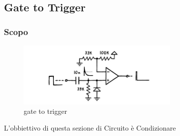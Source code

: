 \documentclass{article}
\theoremstyle{definition}
\begin{document}
\subsection{Gate to Trigger}
\subsubsection{Scopo}

\begin{figure}[htp]
    \centering
    \includegraphics[width=0.7\textwidth]{gatebase.png} 
    \caption{gate to trigger}
    \label{fig:gate to trigger}
\end{figure}
L'obbiettivo di questa sezione di Circuito è Condizionare 
\end{document}
